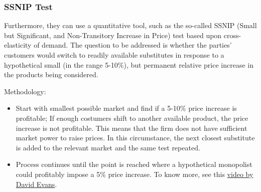         \subsubsection{SSNIP Test}

            Furthermore, they can use a quantitative tool, such as the so-called SSNIP (Small but Significant, and Non-Transitory Increase in Price) test based upon cross-elasticity of demand.
            The question to be addressed is whether the parties' customers would switch to readily available substitutes in response to a hypothetical small (in the range 5-10\%), but permanent relative price increase in the products being considered.

            Methodology:
            \begin{itemize}
                \item Start with smallest possible market and find if a 5-10\% price increase is profitable; If enough costumers shift to another available product, the price increase is not profitable. This means that the firm does not have sufficient market power to raise prices. In this circumstance, the next closest substitute is added to the relevant market and the same test repeated.
                \item Process continues until the point is reached where a hypothetical monopolist could profitably impose a 5\% price increase. To know more, see this \href{https://www.youtube.com/watch?v=5VE6FaCILaU}{video by David Evans}.
            \end{itemize}


